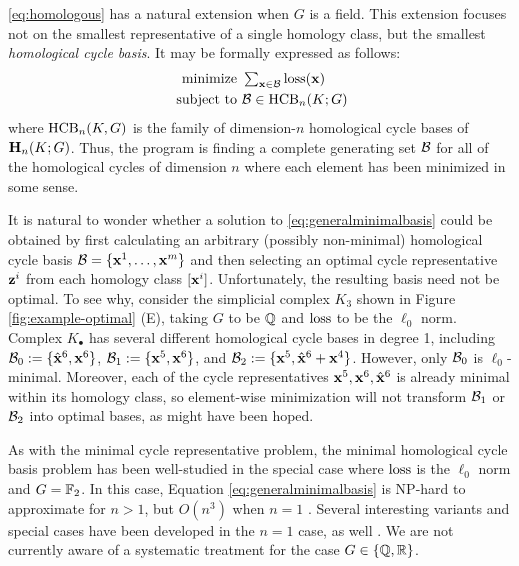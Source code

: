 \pr \eqref{eq:homologous} has a natural extension when $G$ is a field.  This extension focuses not on the smallest representative of a single homology class, but the smallest  \emph{homological cycle basis}.  It may be formally expressed as follows:
\begin{align}
   \begin{split}
    \text{minimize } & \textstyle \sum_{\mathbf{x} \in \mathcal B} \mathrm{loss}(\mathbf{x}) \\
    \text{ subject to } & \mathcal B \in \mathrm{HCB}_n(K ; G)
   \end{split}
   \label{eq:generalminimalbasis}
\end{align}
where $\mathrm{HCB}_n(K, G)$ is the family of dimension-$n$ homological cycle bases of $\mathbf{H}_n(K;G)$. Thus, the program is finding a complete generating set $\mathcal B$ for all of the homological cycles of dimension $n$ where each element has been minimized in some sense.  

It is natural to wonder whether a solution to \pr \eqref{eq:generalminimalbasis} could be obtained by first calculating an arbitrary (possibly non-minimal) homological cycle basis $\mathcal B = \{\mathbf{x}^1, \ldots, \mathbf{x}^m \}$ and then selecting an optimal cycle representative ${\mathbf z}^i$ from each homology class $[\mathbf{x}^i]$.    Unfortunately, the resulting basis need not be optimal.  To see why, consider the simplicial complex $K_3$ shown in Figure \ref{fig:example-optimal} (E), taking $G$ to be $\mathbb{Q}$ and $\mathrm{loss}$ to be the $\ell_0$ norm.  Complex $K_{\bullet}$ has several different homological cycle bases in degree 1, including  $\mathcal B_0: = \{\hat {\mathbf{x}}^6, \mathbf{x}^6\}$, $\mathcal B_1: = \{\mathbf{x}^5,  \mathbf{x}^6\}$, and $\mathcal B_2: = \{ \mathbf{x}^5,  \hat {\mathbf{x}}^6 + \mathbf{x}^4\}$.  However, only $\mathcal B_0$ is $\ell_0$-minimal.  Moreover, each of the cycle representatives $\mathbf{x}^5, \mathbf{x}^6, \hat {\mathbf{x}}^6$ is already minimal within its homology class, so element-wise minimization will not transform  $\mathcal B_1$ or $\mathcal B_2$ into optimal bases, as might have been hoped.  


As with the minimal cycle representative problem, the minimal homological cycle basis problem has been well-studied in the special case where $\mathrm{loss}$ is the $\ell_0$ norm and $G = \mathbb{F}_2$.  In this case, Equation \eqref{eq:generalminimalbasis} is NP-hard to approximate for $n>1$, but  $O(n^3)$ when $n=1$ \cite{dey2018efficient}. Several interesting variants and special cases have been developed in the $n=1$ case, as well \cite{shortestonedimension, erickson2005greedy, chen2010measuring}.  We are not currently aware of a systematic treatment for the case $G \in \{\mathbb{Q}, \mathbb{R}\}$.



